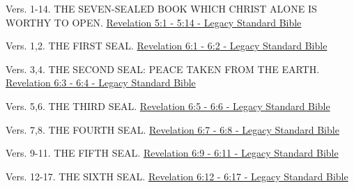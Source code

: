 \documentclass[
  ignorenonframetext,
]{beamer}
\begin{document}
\begin{frame}{5}
\label{section-258}
\begin{block}{Vers. 1-14. THE SEVEN-SEALED BOOK WHICH CHRIST ALONE IS
WORTHY TO OPEN.}
\label{vers.-1-14.-the-seven-sealed-book-which-christ-alone-is-worthy-to-open.}
\href{https://read.lsbible.org/?q=rev5\%3A1-14}{Revelation 5:1 - 5:14 -
Legacy Standard Bible}
\end{block}
\end{frame}

\begin{frame}{6}
\label{section-259}
\begin{block}{Vers. 1,2. THE FIRST SEAL.}
\label{vers.-12.-the-first-seal.}
\href{https://read.lsbible.org/?q=rev6\%3A1-2}{Revelation 6:1 - 6:2 -
Legacy Standard Bible}
\end{block}

\begin{block}{Vers. 3,4. THE SECOND SEAL: PEACE TAKEN FROM THE EARTH.}
\label{vers.-34.-the-second-seal-peace-taken-from-the-earth.}
\href{https://read.lsbible.org/?q=rev6\%3A3-4}{Revelation 6:3 - 6:4 -
Legacy Standard Bible}
\end{block}

\begin{block}{Vers. 5,6. THE THIRD SEAL.}
\label{vers.-56.-the-third-seal.}
\href{https://read.lsbible.org/?q=rev6\%3A5-6}{Revelation 6:5 - 6:6 -
Legacy Standard Bible}
\end{block}

\begin{block}{Vers. 7,8. THE FOURTH SEAL.}
\label{vers.-78.-the-fourth-seal.}
\href{https://read.lsbible.org/?q=rev6\%3A7-8}{Revelation 6:7 - 6:8 -
Legacy Standard Bible}
\end{block}

\begin{block}{Vers. 9-11. THE FIFTH SEAL.}
\label{vers.-9-11.-the-fifth-seal.}
\href{https://read.lsbible.org/?q=rev6\%3A9-11}{Revelation 6:9 - 6:11 -
Legacy Standard Bible}
\end{block}

\begin{block}{Vers. 12-17. THE SIXTH SEAL.}
\label{vers.-12-17.-the-sixth-seal.}
\href{https://read.lsbible.org/?q=rev6\%3A12-17}{Revelation 6:12 - 6:17
- Legacy Standard Bible}
\end{block}
\end{frame}
\end{document}

